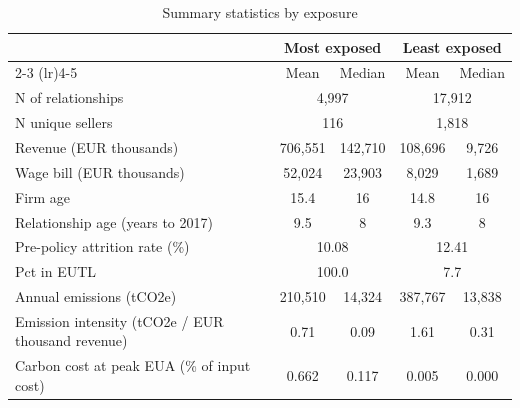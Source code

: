 \begin{table}[ht]
\centering
\caption{Summary statistics by exposure}
\label{tab:phase4_within_nace4d_descriptive_summary_table}
\begin{tabular}{lcccc}
\toprule
 & \multicolumn{2}{c}{Most exposed} & \multicolumn{2}{c}{Least exposed} \\
\cmidrule(lr){2-3} \cmidrule(lr){4-5}
 & Mean & Median & Mean & Median \\
\midrule
N of relationships & \multicolumn{2}{c}{4,997} & \multicolumn{2}{c}{17,912} \\
N unique sellers & \multicolumn{2}{c}{116} & \multicolumn{2}{c}{1,818} \\
\midrule
Revenue (EUR thousands) & 706,551 & 142,710 & 108,696 & 9,726 \\
Wage bill (EUR thousands) & 52,024 & 23,903 & 8,029 & 1,689 \\
Firm age & 15.4 & 16 & 14.8 & 16 \\
Relationship age (years to 2017) & 9.5 & 8 & 9.3 & 8 \\
Pre-policy attrition rate (\%) & \multicolumn{2}{c}{10.08} & \multicolumn{2}{c}{12.41} \\
\midrule
Pct in EUTL & \multicolumn{2}{c}{100.0} & \multicolumn{2}{c}{7.7} \\
Annual emissions (tCO2e) & 210,510 & 14,324 & 387,767 & 13,838 \\
Emission intensity (tCO2e / EUR thousand revenue) & 0.71 & 0.09 & 1.61 & 0.31 \\
Carbon cost at peak EUA (\% of input cost) & 0.662 & 0.117 & 0.005 & 0.000 \\
\bottomrule
\end{tabular}
\end{table}
%
